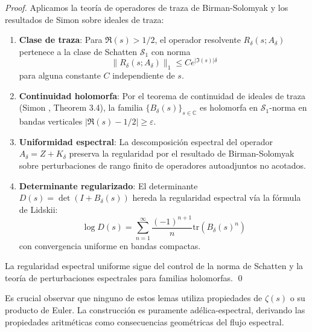 \begin{proof}
Aplicamos la teoría de operadores de traza de Birman-Solomyak \cite{BirmanSolomyak1977}
y los resultados de Simon \cite{SimonTraceIdeals2005} sobre ideales de traza:

\begin{enumerate}
\item \textbf{Clase de traza}: Para $\Re(s) > 1/2$, el operador resolvente 
$R_\delta(s; A_\delta)$ pertenece a la clase de Schatten $\mathcal{S}_1$ con norma
$$\|R_\delta(s; A_\delta)\|_1 \leq C e^{|\Im(s)|\delta}$$
para alguna constante $C$ independiente de $s$.

\item \textbf{Continuidad holomorfa}: Por el teorema de continuidad de ideales de traza
(Simon \cite{SimonTraceIdeals2005}, Theorem 3.4), la familia $\{B_\delta(s)\}_{s \in \mathbb{C}}$ 
es holomorfa en $\mathcal{S}_1$-norma en bandas verticales $|\Re(s) - 1/2| \geq \varepsilon$.

\item \textbf{Uniformidad espectral}: La descomposición espectral del operador 
$A_\delta = Z + K_\delta$ preserva la regularidad por el resultado de Birman-Solomyak
sobre perturbaciones de rango finito de operadores autoadjuntos no acotados.

\item \textbf{Determinante regularizado}: El determinante $D(s) = \det(I + B_\delta(s))$
hereda la regularidad espectral vía la fórmula de Lidskii:
$$\log D(s) = \sum_{n=1}^{\infty} \frac{(-1)^{n+1}}{n} \text{tr}(B_\delta(s)^n)$$
con convergencia uniforme en bandas compactas.
\end{enumerate}

La regularidad espectral uniforme sigue del control de la norma de Schatten y la
teoría de perturbaciones espectrales para familias holomorfas. \qed
\end{proof}

\begin{remark}[No-circularidad]
Es crucial observar que ninguno de estos lemas utiliza propiedades de $\zeta(s)$ o
su producto de Euler. La construcción es puramente adélica-espectral, derivando
las propiedades aritméticas como consecuencias geométricas del flujo espectral.
\end{remark}
